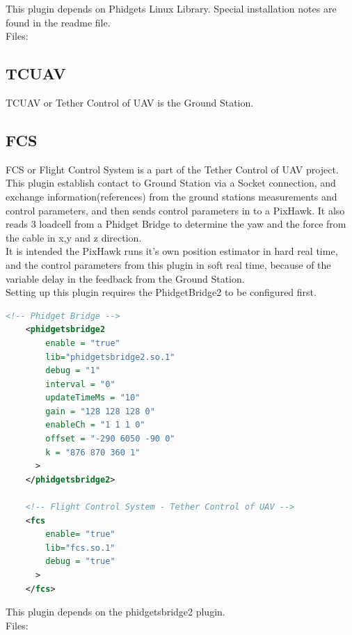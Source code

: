 This plugin depends on Phidgets Linux Library. Special installation notes are found in the readme file.\\

\noindent
Files:

\subsection{TCUAV}
TCUAV or Tether Control of UAV is the Ground Station.


\subsection{FCS}
FCS or Flight Control System is a part of the Tether Control of UAV project. This plugin establish contact to Ground Station via a Socket connection, and exchange information(references) from the ground stations measurements and control parameters, and then sends control parameters in to a PixHawk. It also reads 3 loadcell from a Phidget Bridge to determine the yaw and the force from the cable in x,y and z direction.\\
It is intended the PixHawk runs it's own position estimator in hard real time, and the control parameters from this plugin in soft real time, because of the variable delay in the feedback from the Ground Station.\\

\noindent
Setting up this plugin requires the PhidgetBridge2 to be configured first. 

\noindent
\begin{lstlisting}[language=XML]
<!-- Phidget Bridge -->
    <phidgetsbridge2
	    enable = "true"
	    lib="phidgetsbridge2.so.1"
	    debug = "1"
	    interval = "0"
	    updateTimeMs = "10"
	    gain = "128 128 128 0"
	    enableCh = "1 1 1 0"
	    offset = "-290 6050 -90 0"
	    k = "876 870 360 1"
      >
    </phidgetsbridge2>  
    
    <!-- Flight Control System - Tether Control of UAV -->
    <fcs 
	    enable= "true"
	    lib="fcs.so.1"
	    debug = "true"
      >
    </fcs>  
\end{lstlisting}

\noindent
This plugin depends on the phidgetsbridge2 plugin.\\

\noindent
Files:

